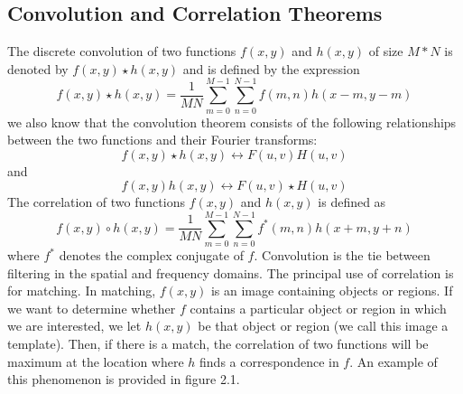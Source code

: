 \subsection{Convolution and Correlation Theorems}
The discrete convolution of two functions $f(x, y)$ and $h(x, y)$ of size $ M * N$ is denoted by $f(x, y) \star h(x, y)$ and is defined by the expression
\begin{equation}
	f(x, y) \star h(x, y) = \frac{1}{MN}\sum_{m = 0}^{M - 1}\sum_{n = 0}^{N - 1}f(m, n)h(x - m, y-m)
\end{equation}
we also know that the convolution theorem consists of the following relationships between the two functions and their Fourier transforms:
\begin{equation}
	f(x, y) \star h(x, y) \leftrightarrow F(u, v)H(u, v)
\end{equation}
and 
\begin{equation}
	f(x, y)h(x, y) \leftrightarrow F(u, v) \star H(u, v)
\end{equation}
The correlation of two functions $f(x, y)$ and $h(x, y)$ is defined as
\begin{equation}
	f(x, y)\circ h(x, y) = \frac{1}{MN} \sum_{m = 0}^{M - 1}\sum_{n = 0}^{N - 1}f^*(m, n)h(x + m, y + n)
\end{equation}
where $f^*$ denotes the complex conjugate of $f$. Convolution is the tie between filtering in the spatial and frequency domains. The principal use of correlation is for matching. In matching, $f(x, y)$ is an image containing objects or regions. If we want to determine whether $f$ contains a particular object or region in which we are interested, we let $h(x, y)$ be that object or region (we call this image a template). Then, if there is a match, the correlation of two functions will be maximum  at the location where $h$ finds a correspondence in $f$. An example of this phenomenon is provided in figure 2.1.
